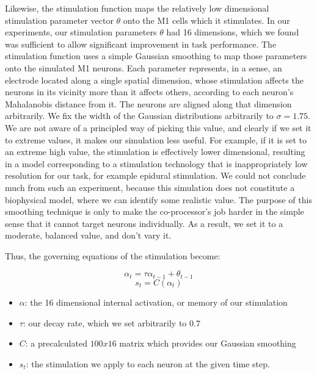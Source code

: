 \documentclass[12pt]{iopart}
\begin{document}
Likewise, the stimulation function maps the relatively low dimensional stimulation
parameter vector $\theta$ onto the M1 cells which it stimulates. In our experiments,
our stimulation parameters $\theta$ had 16 dimensions, which we found was
sufficient to allow significant improvement in task performance. The stimulation
function uses a simple Gaussian smoothing to map those parameters onto the simulated
M1 neurons. Each parameter represents, in a sense, an electrode located along a single
spatial dimension, whose stimulation affects the neurons in its vicinity more than
it affects others, according to each neuron's Mahalanobis distance from it. The neurons
are aligned along that dimension arbitrarily. We fix the width of the Gaussian distributions
arbitrarily to $\sigma=1.75$. We are not aware of a principled way of picking this
value, and clearly if we set it to extreme values, it makes our simulation less useful.
For example, if it is set to an extreme high value, the stimulation is effectively
lower dimensional, resulting in a model corresponding to a stimulation technology that
is inappropriately low resolution for our task, for example epidural stimulation.
We could not conclude much from such an experiment, because this simulation does
not constitute a biophysical model, where we can identify some realistic value. The
purpose of this smoothing technique is only to make the co-processor's job harder in
the simple sense that it cannot target neurons individually. As a result, we set it
to a moderate, balanced value, and don't vary it.

Thus, the governing equations of the stimulation become:

\begin{equation}
\alpha_{t} = \tau\alpha_{t-1} + \theta_{t-1}
\end{equation}
\begin{equation}
s_{t} = C(\alpha_{t})
\end{equation}

\begin{itemize}
	\item $\alpha$: the 16 dimensional internal activation, or memory
        of our stimulation
	\item $\tau$: our decay rate, which we set arbitrarily to $0.7$
	\item $C$: a precalculated $100 x 16$ matrix which provides our
	Gaussian smoothing
	\item $s_{t}$: the stimulation we apply to each neuron at the
	given time step.
\end{itemize}
\end{document}

